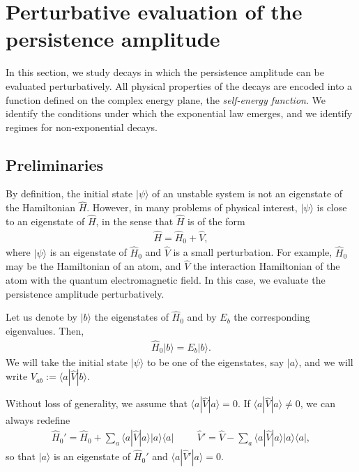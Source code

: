 \documentclass[12pt]{article}
\numberwithin{equation}{section}
\begin{document}
\section{Perturbative evaluation of the persistence amplitude}

In this section, we study decays in which the persistence amplitude can be evaluated perturbatively. All physical properties of the decays are encoded into a function defined on the complex energy plane, the {\em self-energy function}. We identify the conditions under which the exponential law emerges, and we identify regimes for non-exponential decays.

\subsection{ Preliminaries}
By definition, the initial state
 $|\psi\rangle$ of an unstable system is not an eigenstate of the Hamiltonian $\hat{H}$. However, in many problems of physical interest, $|\psi\rangle$ is close to an eigenstate of $\hat{H}$, in the sense that  $\hat{H}$  is of the form
\begin{eqnarray}
\hat{H} = \hat{H}_0 + \hat{V}, \label{Hamper}
\end{eqnarray}
where $|\psi\rangle$ is an eigenstate of $\hat{H}_0$ and  $\hat{V}$ is a small perturbation. For example, $\hat{H}_0$ may be the Hamiltonian of an atom, and $\hat{V}$ the interaction Hamiltonian of the atom with the quantum electromagnetic field.
In this case, we evaluate the persistence amplitude   perturbatively.

Let us denote by $|b\rangle$ the eigenstates of $\hat{H}_0$ and by $E_b$ the corresponding eigenvalues. Then,
\begin{eqnarray}
\hat{H}_0 |b\rangle = E_b|b\rangle.
\end{eqnarray}
We will take the initial state $|\psi\rangle$ to be one of the eigenstates, say $|a\rangle$, and we will write  $V_{ab} := \langle a|\hat{V}|b\rangle$.

Without loss of generality, we     assume that  $\langle a|\hat{V}|a\rangle =0$. If $\langle a|\hat{V}|a\rangle \neq 0$,
  we can always  redefine
 \begin{eqnarray}
 \hat{H}_0' = \hat{H}_0 + \sum_a \langle a|\hat{V}|a\rangle |a\rangle \langle a| \hspace{1cm}  \hat{V}' = \hat{V} - \sum_a \langle a|\hat{V}|a\rangle |a\rangle \langle a|,
  \end{eqnarray}
so that  $|a\rangle$ is an eigenstate of $\hat{H}_0'$ and $\langle a|\hat{V}'|a\rangle = 0$.
\end{document}
